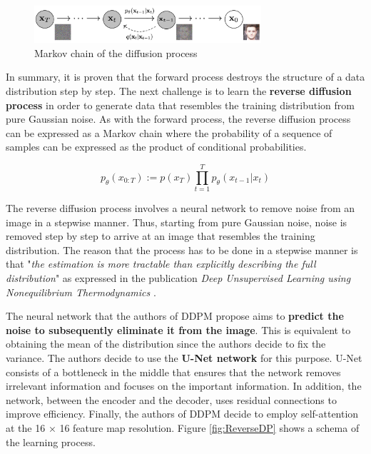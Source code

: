 \begin{figure}
    \centering
    \includegraphics[width=0.75\textwidth]{Pictures/MarkovchainDP} 
    \caption{Markov chain of the diffusion process \cite{ho2020denoising}}
    \label{fig:MarkovchainDP}
\end{figure}

In summary, it is proven that the forward process destroys the structure of a data distribution step by step. The next challenge is to learn the \textbf{reverse diffusion process} in order to generate data that resembles the training distribution from pure Gaussian noise. As with the forward process, the reverse diffusion process can be expressed as a Markov chain where the probability of a sequence of samples can be expressed as the product of conditional probabilities.

\[ p_\theta\left(x_{0:T}\right) := p\left ( x_T \right ) \prod_{t=1}^{T}p_\theta\left ( x_{t-1} | x_t\right ) \]

The reverse diffusion process involves a neural network to remove noise from an image in a stepwise manner. Thus, starting from pure Gaussian noise, noise is removed step by step to arrive at an image that resembles the training distribution. The reason that the process has to be done in a stepwise manner is that "\textit{the estimation is more tractable than explicitly describing the full distribution}" as expressed in the publication \textit{Deep Unsupervised Learning using Nonequilibrium Thermodynamics} \cite{sohl2015deep}.

The neural network that the authors of DDPM propose aims to \textbf{predict the noise to subsequently eliminate it from the image}. This is equivalent to obtaining the mean of the distribution since the authors decide to fix the variance. The authors decide to use the \textbf{U-Net network} \cite{ronneberger2015u} for this purpose. U-Net consists of a bottleneck in the middle that ensures that the network removes irrelevant information and focuses on the important information. In addition, the network, between the encoder and the decoder, uses residual connections to improve efficiency. Finally, the authors of DDPM decide to employ self-attention at the 16 × 16 feature map resolution. Figure \ref{fig:ReverseDP} shows a schema of the learning process.

